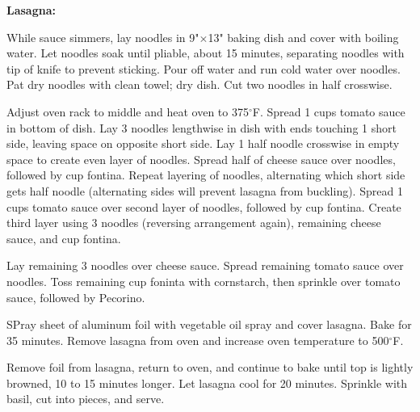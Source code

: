 \begin{recipe}
	
	\textbf{Lasagna:}	
	
	
	While sauce simmers, lay noodles in 9"$\times$13" baking dish and cover with boiling water. Let noodles soak until pliable, about 15 minutes, separating noodles with tip of knife to prevent sticking. Pour off water and run cold water over noodles. Pat dry noodles with clean towel; dry dish. Cut two noodles in half crosswise.
	
	Adjust oven rack to middle and heat oven to 375$^{\circ}$F. Spread 1 cups tomato sauce in bottom of dish. Lay 3 noodles lengthwise in dish with ends touching 1 short side, leaving space on opposite short side. Lay 1 half noodle crosswise in empty space to create even layer of noodles. Spread half of cheese sauce over noodles, followed by  cup fontina. Repeat layering of noodles, alternating which short side gets half noodle (alternating sides will prevent lasagna from buckling). Spread 1 cups tomato sauce over second layer of noodles, followed by  cup fontina. Create third layer using 3 noodles (reversing arrangement again), remaining cheese sauce, and  cup fontina.
	
	Lay remaining 3 noodles over cheese sauce. Spread remaining tomato sauce over noodles. Toss remaining  cup foninta with cornstarch, then sprinkle over tomato sauce, followed by Pecorino.
	
	SPray sheet of aluminum foil with vegetable oil spray and cover lasagna. Bake for 35 minutes. Remove lasagna from oven and increase oven temperature to 500$^{\circ}$F.
	
	Remove foil from lasagna, return to oven, and continue to bake until top is lightly browned, 10 to 15 minutes longer. Let lasagna cool for 20 minutes. Sprinkle with basil, cut into pieces, and serve.
	
	
	
\end{recipe}
